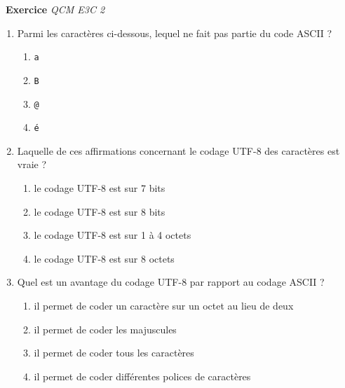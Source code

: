 \documentclass[a4paper, french, 12pt]{article}  %
\newcounter{exo}
\newenvironment{exercice}[1]
{\par \medskip   \addtocounter{exo}{1} \noindent  
\begin{bclogo}[arrondi =0.1,   noborder = true, logo=\bccrayon, marge=4]{~\textbf{Exercice} \textbf{\theexo} {\itshape #1} }  \par}
{
\end{bclogo}
 \par \bigskip }
\begin{document}
\vspace*{-20pt}



\begin{exercice}{QCM E3C 2}

\begin{enumerate}
\item  Parmi les caractères ci-dessous, lequel ne fait pas partie du code ASCII ?

\begin{multicols}{4}

\begin{enumerate}
 \item \texttt{a}
 \item \texttt{B}
 \item \texttt{@}
 \item \texttt{é}
\end{enumerate}

\end{multicols}

\item Laquelle de ces affirmations concernant le codage UTF-8 des caractères est vraie ?

\begin{multicols}{2}
\begin{enumerate}
\item le codage UTF-8 est sur 7 bits

\item le codage UTF-8 est sur 8 bits
\item le codage UTF-8 est sur 1 à 4 octets
\item le codage UTF-8 est sur 8 octets
\end{enumerate}
\end{multicols}

\item Quel est un avantage du codage UTF-8 par rapport au codage ASCII ?

\begin{enumerate}
	\item il permet de coder un caractère sur un octet au lieu de deux
	\item il permet de coder les majuscules
	\item il permet de coder tous les caractères
	\item il permet de coder différentes polices de caractères
\end{enumerate}

\end{enumerate}





\end{exercice}
\end{document}
